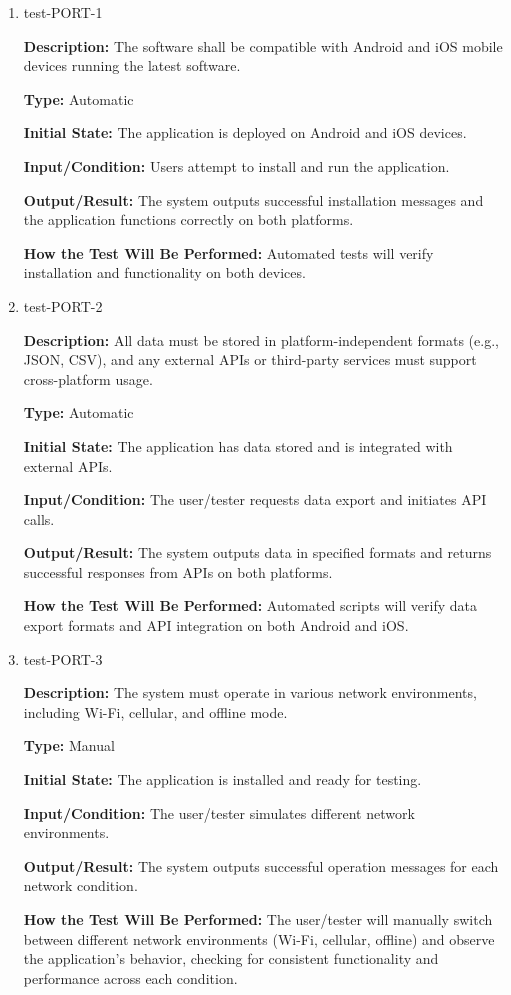 \documentclass[12pt, titlepage]{article}
\begin{document}
\begin{enumerate}

\item{test-PORT-1\\}

\textbf{Description:} The software shall be compatible with Android and iOS mobile devices running the latest software.

\textbf{Type:} Automatic
					
\textbf{Initial State:} The application is deployed on Android and iOS devices.
					
\textbf{Input/Condition:} Users attempt to install and run the application.
					
\textbf{Output/Result:} The system outputs successful installation messages and the application functions correctly on both platforms.
					
\textbf{How the Test Will Be Performed:} Automated tests will verify installation and functionality on both devices.

\item{test-PORT-2\\}

\textbf{Description:} All data must be stored in platform-independent formats (e.g., JSON, CSV), and any external APIs or third-party services must support cross-platform usage.

\textbf{Type:} Automatic
					
\textbf{Initial State:} The application has data stored and is integrated with external APIs.
					
\textbf{Input/Condition:} The user/tester requests data export and initiates API calls.
					
\textbf{Output/Result:} The system outputs data in specified formats and returns successful responses from APIs on both platforms.
					
\textbf{How the Test Will Be Performed:} Automated scripts will verify data export formats and API integration on both Android and iOS.

\item{test-PORT-3\\}

\textbf{Description:} The system must operate in various network environments, including Wi-Fi, cellular, and offline mode.

\textbf{Type:} Manual
					
\textbf{Initial State:} The application is installed and ready for testing.
					
\textbf{Input/Condition:} The user/tester simulates different network environments.
					
\textbf{Output/Result:} The system outputs successful operation messages for each network condition.
					
\textbf{How the Test Will Be Performed:} The user/tester will manually switch between different network environments (Wi-Fi, cellular, offline) and observe the application's behavior, checking for consistent functionality and performance across each condition.

\end{enumerate}
\end{document}
